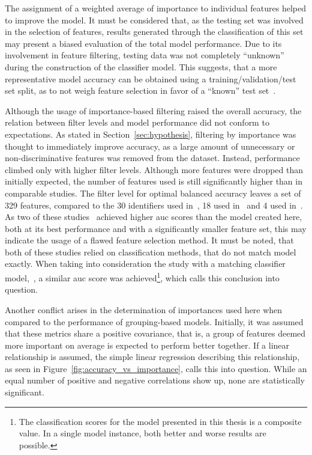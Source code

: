 The assignment of a weighted average of importance to individual features helped
to improve the model. It must be considered that, as the testing set was involved in the selection of
features, results generated through the classification of this set may present
a biased evaluation of the total model performance. Due to its involvement in 
feature filtering, testing data was not completely \enquote{unknown} during the
construction of the classifier model. This suggests, that a more 
representative model accuracy can be obtained using a training/validation/test 
set split, as to not weigh feature selection in favor of a \enquote{known} 
test set~\cite{fundamentals_of_machine_learning}.

Although the usage of importance-based filtering raised the overall accuracy, the relation
between filter levels and model performance did not conform to 
expectations. As stated in Section~\ref{sec:hypothesis}, filtering by importance
was thought to immediately improve accuracy, as a large amount of unnecessary
or non-discriminative features was removed from the dataset. Instead, performance
climbed only with higher filter levels. Although more features were dropped than
initially expected, the number of features used is still significantly higher 
than in comparable studies. The filter level for optimal balanced accuracy 
leaves a set of 329 features, compared to the 30 identifiers used 
in~\cite{radiomics_analysis_pcr_rectal}, 18 used in~\cite{rectal_radiomics_svm_rf} 
and 4 used in~\cite{multisite_rectal_radiomics}. %
As two of these studies~\cite{radiomics_analysis_pcr_rectal,rectal_radiomics_svm_rf} achieved higher \ac{auc} scores than the model created 
here, both at its best performance and with a significantly smaller feature set,
this may indicate the usage of a flawed feature selection method.
It must be noted, that both of these studies relied on classification methods,
that do not match  model exactly. When taking into consideration the
study with a matching classifier model,~\cite{multisite_rectal_radiomics}, a
similar \ac{auc} score was achieved\footnote{The classification scores for the model
presented in this thesis is a composite value. In a single model instance, both
better and worse results are possible.}, which calls this conclusion 
into question.

Another conflict arises in the determination of importances used here when 
compared to the performance of grouping-based models. Initially, it was assumed
that these metrics share a positive covariance, that is, a group of features 
deemed more important on average is expected to perform better together. 
If a linear relationship is assumed, the simple linear regression describing 
this relationship, as seen in Figure~\ref{fig:accuracy_vs_importance}, calls this
into question. While an equal number of positive and negative correlations show
up, none are statistically significant. 

